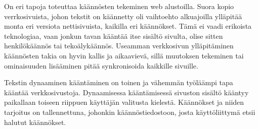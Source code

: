 \documentclass[11pt,a4paper,titlepage,oneside]{article}
\begin{document}
%









On eri tapoja toteuttaa käännösten tekeminen web alustoilla. 
Suora kopio verrkosivuista, johon tekstit on käännetty oli vaihtoehto alkuajoilla
ylläpitää monta eri versiota nettisivuista, kaikilla eri käännökset.
Tämä ei vaadi erikoista teknologiaa, vaan jonkun tavan kääntää itse sisältö sivulta,
olise sitten henkilökäännös tai tekoälykäännös.
Useamman verkkosivun ylläpitäminen käännösten takia on hyvin kallis ja aikaavievä, 
sillä muutoksen tekeminen tai ominaisuuden lisääminen pitää synkronisoida kaikkille sivuille.\citemissing
\medskip



Tekstin dynaaminen kääntäminen on toinen ja vähemmän työläämpi tapa kääntää verkkosivustoja.
Dynaamisessa kääntämisessä sivuston sisältö kääntyy paikallaan toiseen riippuen käyttäjän valitusta kielestä.
Käännökset ja niiden tarjoitus on tallennettuna, johonkin käännöstiedostoon, 
josta käyttöliittymä etsii halutut käännökset.\citemissing
\medskip
\end{document}
